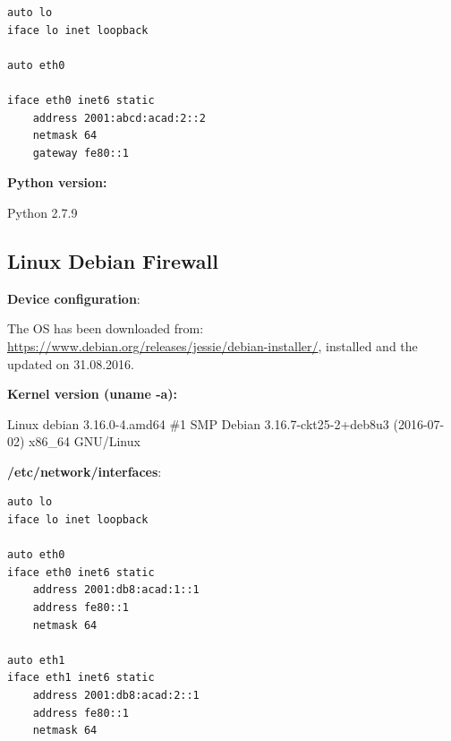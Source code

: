 \documentclass[12pt]{article}
\begin{document}
\vspace{-5pt}
\begin{lstlisting}[style=python,basicstyle=\ttfamily\scriptsize]
auto lo
iface lo inet loopback

auto eth0

iface eth0 inet6 static
	address 2001:abcd:acad:2::2
	netmask 64
	gateway fe80::1
\end{lstlisting}

\textbf{Python version:} 

\vspace{-15pt}
Python 2.7.9

\subsection{Linux Debian Firewall}

\textbf{Device configuration}:

\begin{savenotes}
\begin{table}[!htpb]
\centering
\addtolength{\tabcolsep}{1pt}
\noindent{}
\caption{Linux Debian Firewall}
\label{table:linuxDebFirewall}
\end{table}
\end{savenotes}

The OS has been downloaded from: \url{https://www.debian.org/releases/jessie/debian-installer/}, installed and the updated on 31.08.2016.

\textbf{Kernel version (uname -a):} 

\vspace{-15pt}
Linux debian 3.16.0-4.amd64 \#1 SMP Debian 3.16.7-ckt25-2+deb8u3 (2016-07-02) x86_64 GNU/Linux

\textbf{/etc/network/interfaces}:

\vspace{-5pt}
\begin{lstlisting}[style=python,basicstyle=\ttfamily\scriptsize]
auto lo
iface lo inet loopback

auto eth0
iface eth0 inet6 static
	address 2001:db8:acad:1::1
	address fe80::1
	netmask 64

auto eth1
iface eth1 inet6 static
	address 2001:db8:acad:2::1
	address fe80::1
	netmask 64
\end{lstlisting}
\end{document}
